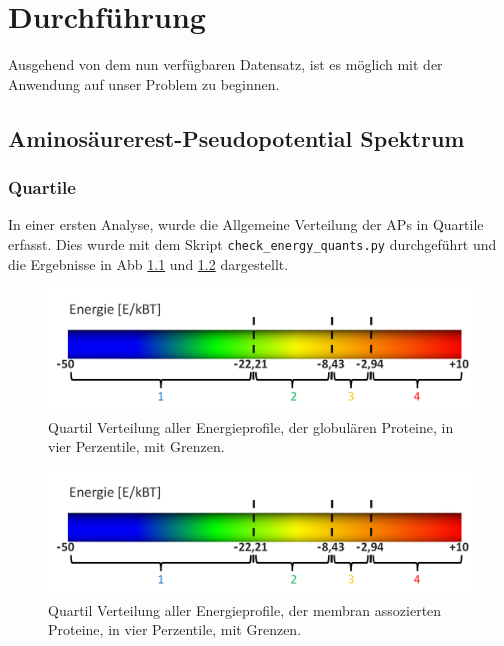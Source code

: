 \chapter{Durchführung}

Ausgehend von dem nun verfügbaren Datensatz, ist es möglich mit der Anwendung auf unser Problem zu beginnen.



\section{Aminosäurerest-Pseudopotential Spektrum}


\subsection{Quartile}
In einer ersten Analyse, wurde die Allgemeine Verteilung der \ac{APs} in Quartile erfasst. Dies wurde mit dem Skript \texttt{check\_energy\_quants.py} durchgeführt und die Ergebnisse in \ac{Abb} \ref{fig:quartiles_glob} und \ref{fig:quartiles_memb} dargestellt. 
%
\begin{figure}
\centering
\includegraphics[width=.95\textwidth]{images/Quartile_Mathias.png}
\caption{Quartil Verteilung aller Energieprofile, der globulären Proteine, in vier Perzentile, mit Grenzen.}
\label{fig:quartiles_glob}
\end{figure}

\begin{figure}
\centering
\includegraphics[width=.95\textwidth]{images/Quartile_Mathias.png}
\caption{Quartil Verteilung aller Energieprofile, der membran assozierten Proteine, in vier Perzentile, mit Grenzen.}
\label{fig:quartiles_memb}
\end{figure}

